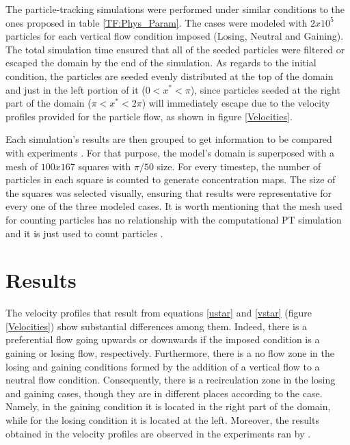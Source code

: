 \documentclass[draft,linenumbers]{agujournal2018}
\begin{document}
The particle-tracking simulations were performed under similar conditions to the ones proposed in table \ref{TF:Phys_Param}. The cases were modeled with $2x10^5$ particles for each vertical flow condition imposed (Losing, Neutral and Gaining). The total simulation time ensured that all of the seeded particles were filtered or escaped the domain by the end of the simulation. As regards to the initial condition, the particles are seeded evenly distributed at the top of the domain and just in the left portion of it ($0 < x^* < \pi$), since particles seeded at the right part of the domain ($\pi < x^* < 2\pi$) will immediately escape due to the velocity profiles provided for the particle flow, as shown in figure \ref{Velocities}. 

Each simulation's results are then grouped to get information to be compared with experiments \citep{Fox2014,Fox2018}. For that purpose, the model's domain is superposed with a mesh of $100 x167$ squares with $\pi / 50$ size. For every timestep, the number of particles in each square is counted to generate concentration maps. The size of the squares was selected visually, ensuring that results were representative for every one of the three modeled cases. It is worth mentioning that the mesh used for counting particles has no relationship with the computational PT simulation and it is just used to count particles \citep{Xue2017}.

\section{Results}  \label{Results}

The velocity profiles that result from equations \ref{ustar} and \ref{vstar} (figure \ref{Velocities}) show substantial differences among them. Indeed, there is a preferential flow going upwards or downwards if the imposed condition is a gaining or losing flow, respectively. Furthermore, there is a no flow zone in the losing and gaining conditions formed by the addition of a vertical flow to a neutral flow condition. Consequently, there is a recirculation zone in the losing and gaining cases, though they are in different places according to the case. Namely, in the gaining condition it is located in the right part of the domain, while for the losing condition it is located at the left. Moreover, the results obtained in the velocity profiles are observed in the experiments ran by \citet{Fox2018}.
\end{document}
